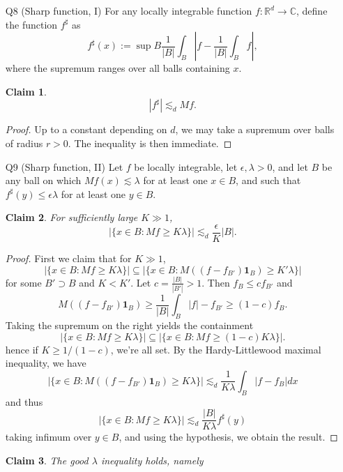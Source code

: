 \documentclass[11pt]{article}
\newtheorem*{claim}{Claim}
\theoremstyle{remark}
\newcommand{\1}{\textbf{1}}
\newcommand{\lle}{\lesssim}
\def\norm#1{\| #1  \|}
\newcommand{\bbR}{\mathbb{R}}
\newcommand{\bbC}{\mathbb{C}}
\begin{document}
\begin{enumerate}
\begin{proof}
\[
\int \phi_I|f_1 - c_I|^2 dx = \int \phi_I \sum_{n=1}^{N-1}|c_n|^2|e^{2 \pi i \xi_n x} - e^{2 \pi i \xi_n a}|^2 dx \lle \sum_{n=1}^{N-1} |\xi_{N-1}|^2|c_n|^2 \int |x-a|^2 .
\]
Thus
\[
(1) \lle  |b-a|^3 |I|^{-2} = |I|.
\]
By the alternate characterization of the BMO norm, $L^p$ version, it follows that $\norm{f}_{BMO} \lle 1$.
\end{proof}
\item[Q8](Sharp function, I) For any locally integrable function $f:\bbR^d \to \bbC$, define the function $f^\sharp$ as
\[
f^\sharp(x) := \sup B \frac{1}{|B|} \int_B \left|f - \frac{1}{|B|} \int_{B} f \right|,
\]
where the supremum ranges over all balls containing $x$.
\begin{claim}
\[
|f^\sharp| \lle_d Mf.
\]
\end{claim}
\begin{proof}
Up to a constant depending on $d$, we may take a supremum over balls of radius $r > 0$. The inequality is then immediate.
\end{proof}
\item[Q9] (Sharp function, II) Let $f$ be locally integrable, let $\epsilon, \lambda > 0$, and let $B$ be any ball on which $Mf(x) \lle \lambda$ for at least one $x \in B$, and such that $f^\sharp(y) \leq \epsilon \lambda$ for at least one $y \in B$.
\begin{claim}
For sufficiently large $K \gg 1$,
\[
|\{x \in B : Mf \geq K\lambda \}| \lle_d \frac{\epsilon}{K} |B|.
\]
\end{claim}
\begin{proof}
First we claim that for $K \gg 1$,
\[
|\{x \in B : Mf \geq K\lambda \}| \subseteq |\{x \in B : M((f - f_{B'})\1_B) \geq K' \lambda \}|
\]
for some $B' \supset B$ and $K < K'$. Let $c = \frac{|B|}{|B'|} > 1$. Then $f_{B} \leq c f_{B'}$ and
\[
M((f - f_{B'})\1_B) \geq \frac{1}{|B|} \int_B |f| - f_{B'} \geq \left(1 - c \right) f_B.
\]
Taking the supremum on the right yields the containment 
\[
|\{x \in B : Mf \geq K\lambda \}| \subseteq |\{x \in B : Mf \geq \left(1 - c \right)  K \lambda \}|.
\]
hence if $K \geq 1/(1-c)$, we're all set. By the Hardy-Littlewood maximal inequality, we have
\[
|\{x \in B : M((f - f_{B'})\1_B) \geq K\lambda \}| \lle_d \frac{1}{K\lambda} \int_B |f - f_B| dx
\]
and thus
\[
|\{x \in B : Mf \geq K\lambda \}| \lle_d \frac{|B|}{K\lambda} f^\sharp(y)
\]
taking infimum over $y \in B$, and using the hypothesis, we obtain the result.
\end{proof}
\begin{claim}
The good $\lambda$ inequality holds, namely

\end{claim}
\end{enumerate}
\end{document}
